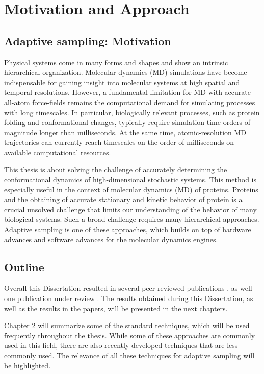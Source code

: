 \chapter{Motivation and Approach}

\section{Adaptive sampling: Motivation}
Physical systems come in many forms and shapes and show an intrinsic hierarchical organization. Molecular dynamics (MD) simulations have become indispensable for gaining
insight into molecular systems at high spatial and temporal resolutions.
However, a fundamental limitation for MD with accurate all-atom force-fields remains
the computational demand for simulating processes with long timescales. In
particular, biologically relevant processes, such as protein folding and
conformational changes, typically require simulation time orders of magnitude longer than
milliseconds. At the same time, atomic-resolution MD trajectories can currently reach
timescales on the order of milliseconds on available computational resources. 

This thesis is about solving the challenge of accurately determining the conformational dynamics of high-dimensional stochastic systems. This method is especially useful in the context of molecular dynamics (MD) of proteins. Proteins and the obtaining of accurate stationary and kinetic behavior of protein is a crucial unsolved challenge that limits our understanding of the behavior of many biological systems. Such a broad challenge requires many hierarchical approaches. Adaptive sampling is one of these approaches, which builds on top of hardware advances and software advances for the molecular dynamics engines.

\section{Outline}
 
 Overall this Dissertation resulted in several peer-reviewed publications \cite{Adstrategies2018, Extasy2016}, as well one publication under review \cite{Extasy2019}. The results obtained during this Dissertation, as well as the results in the papers, will be presented in the next chapters.
 
Chapter 2 will summarize some of the standard techniques, which will be used frequently throughout the thesis. While some of these approaches are commonly used in this field, there are also recently developed techniques that are less commonly used. The relevance of all these techniques for adaptive sampling will be highlighted. 

